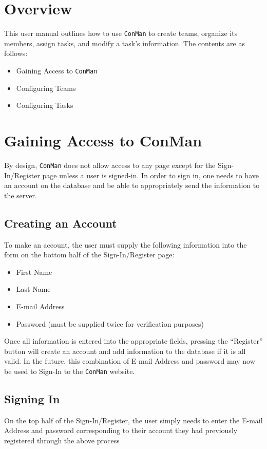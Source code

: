 \documentclass[12pt]{article}
\begin{document}
\newpage
\tableofcontents

\newpage
\section{Overview}
This user manual outlines how to use \verb|ConMan| to create teams, organize its members, assign tasks, and modify a task's information.  The contents are as follows:
\begin{itemize}
  \item Gaining Access to \verb|ConMan|
  \item Configuring Teams
  \item Configuring Tasks
\end{itemize}

\newpage
\section{Gaining Access to ConMan}
By design, \verb|ConMan| does not allow access to any page except for the Sign-In/Register page unless a user is signed-in.  In order to sign in, one needs to have an account on the database and be able to appropriately send the information to the server.
\subsection{Creating an Account}
To make an account, the user must supply the following information into the form on the bottom half of the Sign-In/Register page:
\begin{itemize}
  \item First Name
  \item Last Name
  \item E-mail Address
  \item Password (must be supplied twice for verification purposes)
\end{itemize}
Once all information is entered into the appropriate fields, pressing the ``Register'' button will create an account and add information to the database if it is all valid.  In the future, this combination of E-mail Address and password may now be used to Sign-In to the \verb|ConMan| website.
\subsection{Signing In}
On the top half of the Sign-In/Register, the user simply needs to enter the E-mail Address and password corresponding to their account they had previously registered through the above process
\end{document}
